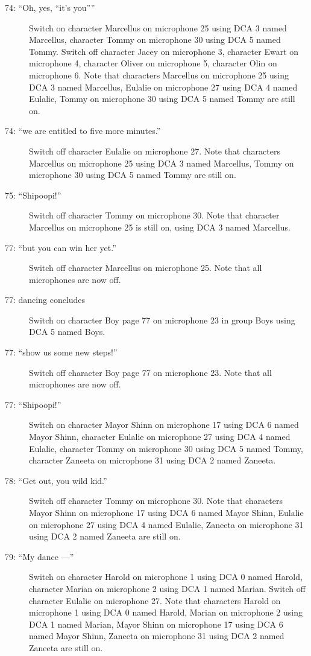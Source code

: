 \begin{description}
\item[74: ``Oh, yes, ``it's you'''']
Switch on character Marcellus on microphone 25 using DCA 3 named Marcellus, character Tommy on microphone 30 using DCA 5 named Tommy. Switch off character Jacey on microphone 3, character Ewart on microphone 4, character Oliver on microphone 5, character Olin on microphone 6. Note that characters Marcellus on microphone 25 using DCA 3 named Marcellus, Eulalie on microphone 27 using DCA 4 named Eulalie, Tommy on microphone 30 using DCA 5 named Tommy are still on.  

\item[74: ``we are entitled to five more minutes.'']
Switch off character Eulalie on microphone 27. Note that characters Marcellus on microphone 25 using DCA 3 named Marcellus, Tommy on microphone 30 using DCA 5 named Tommy are still on.  

\item[75: ``Shipoopi!'']
Switch off character Tommy on microphone 30. Note that character Marcellus on microphone 25 is still on, using DCA 3 named Marcellus.

\item[77: ``but you can win her yet.'']
Switch off character Marcellus on microphone 25. Note that all microphones are now off.

\item[77: dancing concludes]
Switch on character Boy page 77 on microphone 23 in group Boys using DCA 5 named Boys. 

\item[77: ``show us some new steps!'']
Switch off character Boy page 77 on microphone 23. Note that all microphones are now off.

\item[77: ``Shipoopi!'']
Switch on character Mayor Shinn on microphone 17 using DCA 6 named Mayor Shinn, character Eulalie on microphone 27 using DCA 4 named Eulalie, character Tommy on microphone 30 using DCA 5 named Tommy, character Zaneeta on microphone 31 using DCA 2 named Zaneeta. 

\item[78: ``Get out, you wild kid.'']
Switch off character Tommy on microphone 30. Note that characters Mayor Shinn on microphone 17 using DCA 6 named Mayor Shinn, Eulalie on microphone 27 using DCA 4 named Eulalie, Zaneeta on microphone 31 using DCA 2 named Zaneeta are still on.  

\item[79: ``My dance ---'']
Switch on character Harold on microphone 1 using DCA 0 named Harold, character Marian on microphone 2 using DCA 1 named Marian. Switch off character Eulalie on microphone 27. Note that characters Harold on microphone 1 using DCA 0 named Harold, Marian on microphone 2 using DCA 1 named Marian, Mayor Shinn on microphone 17 using DCA 6 named Mayor Shinn, Zaneeta on microphone 31 using DCA 2 named Zaneeta are still on.  


\end{description}
